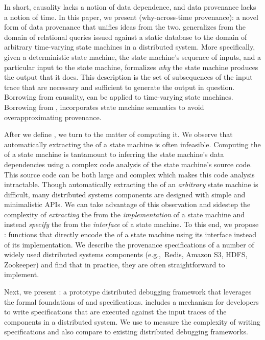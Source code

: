 In short, causality lacks a notion of data dependence, and data provenance
lacks a notion of time. In this paper, we present 
(why-across-time provenance): a novel form of data provenance that unifies
ideas from the two. \Watprovenance{} generalizes \whyprovenance{} from the
domain of relational queries issued against a static database to the domain of
arbitrary time-varying state machines in a distributed system. More
specifically, given a deterministic state machine, the state machine's sequence
of inputs, and a particular input to the state machine, \watprovenance{}
formalizes \emph{why} the state machine produces the output that it does. This
description is the set of subsequences of the input trace that are necessary
and sufficient to generate the output in question. Borrowing from causality,
\watprovenance{} can be applied to time-varying state machines.  Borrowing from
\whyprovenance{}, \watprovenance{} incorporates state machine semantics to
avoid overapproximating provenance.

After we define \watprovenance{}, we turn to the matter of computing it. We
observe that automatically extracting the \watprovenance{} of a state machine
is often infeasible. Computing the \watprovenance{} of a state machine is
tantamount to inferring the state machine's data dependencies using a complex
code analysis of the state machine's source code. This source code can be both
large and complex which makes this code analysis intractable.
%
Though automatically extracting the \watprovenance{} of an \emph{arbitrary}
state machine is difficult, many distributed systems components are designed
with simple and minimalistic APIs. We can take advantage of this observation
and sidestep the complexity of \emph{extracting} the \watprovenance{} from the
\emph{implementation} of a state machine and instead \emph{specify} the
\watprovenance{} from the \emph{interface} of a state machine. To this end, we
propose : functions that directly
encode the \watprovenance{} of a state machine using its interface instead of
its implementation. We describe the provenance specifications of a number of
widely used distributed systems components (e.g.,\ Redis, Amazon S3, HDFS,
Zookeeper) and find that in practice, they are often straightforward to
implement.

Next, we present \fluent{}: a prototype distributed debugging framework that
leverages the formal foundations of \watprovenance{} and \watprovenance{}
specifications. \fluent{} includes a mechanism for developers to write
\watprovenance{} specifications that are executed against the input traces of
the components in a distributed system. We use \fluent{} to measure the
complexity of writing \watprovenance{} specifications and also compare
\fluent{} to existing distributed debugging frameworks.

